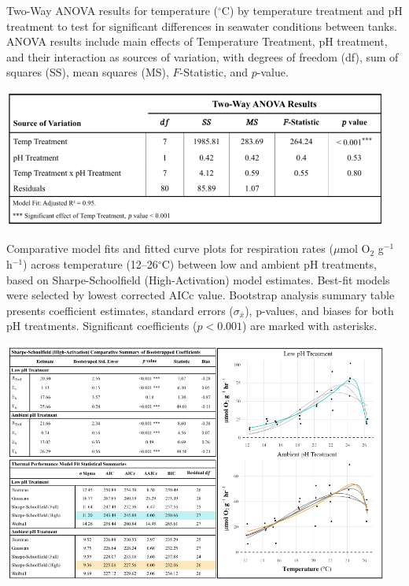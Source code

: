 \documentclass{CSUNthesis}
\begin{document}
\newpage

\begin{table}[H]
\caption[Two-Way ANOVA for seawater temperature treatments.]{Two-Way ANOVA results for temperature ($^\circ$C) by temperature treatment and pH treatment to test for significant differences in seawater conditions between tanks. ANOVA results include main effects of Temperature Treatment, pH treatment, and their interaction as sources of variation, with degrees of freedom (df), sum of squares (SS), mean squares (MS), $F$-Statistic, and $p$-value.}
\centering
\includegraphics[width=5in]{figures/appendix/Appendix_4_Mesocosm_ANOVA_Temp.png}
\label{tab:appendixB3}
\end{table}

\newpage

\begin{table}[H]
\caption[Comparative model fits for respiration rates.]{Comparative model fits and fitted curve plots for respiration rates ($\mu$mol O$_2$ g$^{-1}$ h$^{-1}$) across temperature (12–26$^\circ$C) between low and ambient pH treatments, based on Sharpe-Schoolfield (High-Activation) model estimates. Best-fit models were selected by lowest corrected AICc value. Bootstrap analysis summary table presents coefficient estimates, standard errors ($\sigma_{\bar{x}}$), p-values, and biases for both pH treatments. Significant coefficients ($p < 0.001$) are marked with asterisks.}
\centering
\includegraphics[width=5in]{figures/appendix/Appendix_5_Model_Selection.png}
\label{tab:appendixB4}
\end{table}
\end{document}
